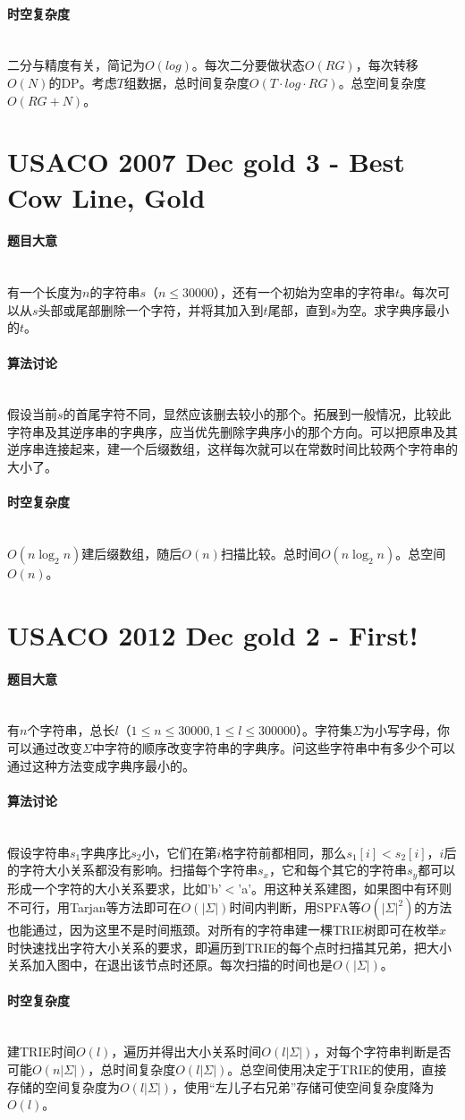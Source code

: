 \documentclass[UTF8]{ctexart}
\newcommand{\myparagraph}[1]{\paragraph{#1}\mbox{}\\}
\theoremstyle{nonumberplain}
\begin{document}
		\myparagraph{时空复杂度}
		
			二分与精度有关，简记为$O(log)$。每次二分要做状态$O(RG)$，每次转移$O(N)$的DP。考虑$T$组数据，总时间复杂度$O(T \cdot log \cdot RG)$。总空间复杂度$O(RG+N)$。
	
	\section{USACO 2007 Dec gold 3 - Best Cow Line, Gold}
	
		\myparagraph{题目大意}
		
			有一个长度为$n$的字符串$s$（$n \leq 30000$），还有一个初始为空串的字符串$t$。每次可以从$s$头部或尾部删除一个字符，并将其加入到$t$尾部，直到$s$为空。求字典序最小的$t$。
		
		\myparagraph{算法讨论}
		
			假设当前$s$的首尾字符不同，显然应该删去较小的那个。拓展到一般情况，比较此字符串及其逆序串的字典序，应当优先删除字典序小的那个方向。可以把原串及其逆序串连接起来，建一个后缀数组，这样每次就可以在常数时间比较两个字符串的大小了。
		
		\myparagraph{时空复杂度}
		
			$O(n\log_2n)$建后缀数组，随后$O(n)$扫描比较。总时间$O(n\log_2n)$。总空间$O(n)$。
	
	\section{USACO 2012 Dec gold 2 - First!}
		
		\myparagraph{题目大意}
		
			有$n$个字符串，总长$l$（$1 \leq n \leq 30000, 1 \leq l \leq 300000$）。字符集$\Sigma$为小写字母，你可以通过改变$\Sigma$中字符的顺序改变字符串的字典序。问这些字符串中有多少个可以通过这种方法变成字典序最小的。
		
		\myparagraph{算法讨论}
		
			假设字符串$s_1$字典序比$s_2$小，它们在第$i$格字符前都相同，那么$s_1[i]<s_2[i]$，$i$后的字符大小关系都没有影响。扫描每个字符串$s_x$，它和每个其它的字符串$s_y$都可以形成一个字符的大小关系要求，比如'b'$<$'a'。用这种关系建图，如果图中有环则不可行，用Tarjan等方法即可在$O(|\Sigma|)$时间内判断，用SPFA等$O(|\Sigma|^2)$的方法也能通过，因为这里不是时间瓶颈。对所有的字符串建一棵TRIE树即可在枚举$x$时快速找出字符大小关系的要求，即遍历到TRIE的每个点时扫描其兄弟，把大小关系加入图中，在退出该节点时还原。每次扫描的时间也是$O(|\Sigma|)$。
		
		\myparagraph{时空复杂度}
		
			建TRIE时间$O(l)$，遍历并得出大小关系时间$O(l|\Sigma|)$，对每个字符串判断是否可能$O(n|\Sigma|)$，总时间复杂度$O(l|\Sigma|)$。总空间使用决定于TRIE的使用，直接存储的空间复杂度为$O(l|\Sigma|)$，使用“左儿子右兄弟”存储可使空间复杂度降为$O(l)$。
	
\end{document}
